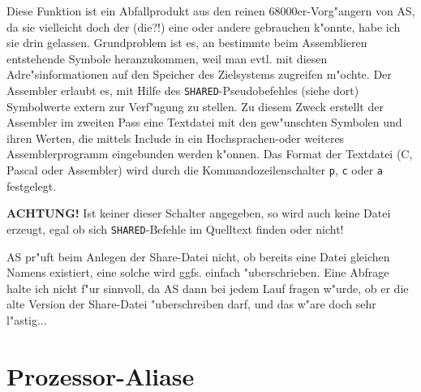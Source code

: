 \documentclass[12pt,a4paper,twoside]{report}
\newcommand{\bb}[1]{{\bf #1}}
\newcommand{\tty}[1]{{\tt #1}}
\newcommand{\asname}{AS}
\begin{document}
Diese Funktion ist ein Abfallprodukt aus den reinen 68000er-Vorg"angern
von \asname{}, da sie vielleicht doch der (die?!) eine oder andere gebrauchen
k"onnte, habe ich sie drin gelassen.  Grundproblem ist es, an bestimmte
beim Assemblieren entstehende Symbole heranzukommen, weil man evtl. mit
diesen Adre"sinformationen auf den Speicher des Zielsystems zugreifen
m"ochte.  Der Assembler erlaubt es, mit Hilfe des \tty{SHARED}-Pseudobefehles
(siehe dort) Symbolwerte extern zur Verf"ugung zu stellen.  Zu diesem
Zweck erstellt der Assembler im zweiten Pass eine Textdatei mit den
gew"unschten Symbolen und ihren Werten, die mittels Include in ein
Hochsprachen-oder weiteres Assemblerprogramm eingebunden werden k"onnen.
Das Format der Textdatei (C, Pascal oder Assembler) wird durch die
Kommandozeilenschalter \tty{p}, \tty{c} oder \tty{a} festgelegt.
\par
\bb{ACHTUNG!} Ist keiner dieser Schalter angegeben, so wird auch keine
Datei erzeugt, egal ob sich \tty{SHARED}-Befehle im Quelltext finden oder
nicht!
\par
\asname{} pr"uft beim Anlegen der Share-Datei nicht, ob bereits eine Datei gleichen
Namens existiert, eine solche wird ggfs. einfach "uberschrieben.  Eine
Abfrage halte ich nicht f"ur sinnvoll, da \asname{} dann bei jedem Lauf fragen
w"urde, ob er die alte Version der Share-Datei "uberschreiben darf, und das
w"are doch sehr l"astig...


\section{Prozessor-Aliase}
\label{SectAlias}
\end{document}
